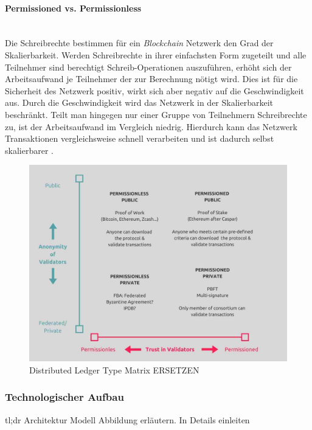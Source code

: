 \paragraph{Permissioned vs. Permissionless}$~~$\\
Die Schreibrechte bestimmen für ein \textit{Blockchain} Netzwerk den Grad der Skalierbarkeit. Werden Schreibrechte in ihrer einfachsten Form zugeteilt und alle Teilnehmer sind berechtigt Schreib-Operationen auszuführen, erhöht sich der Arbeitsaufwand je Teilnehmer der zur Berechnung nötigt wird. Dies ist für die Sicherheit des Netzwerk positiv, wirkt sich aber negativ auf die Geschwindigkeit aus. Durch die Geschwindigkeit wird das Netzwerk in der Skalierbarkeit beschränkt. Teilt man hingegen nur einer Gruppe von Teilnehmern Schreibrechte zu, ist der Arbeitsaufwand im Vergleich niedrig. Hierdurch kann das Netzwerk Transaktionen vergleichsweise schnell verarbeiten und ist dadurch selbst skalierbarer \citep{Drescher2017}.

\begin{figure}[h!]
	\centering
	\includegraphics[width=1.0\linewidth]{pictures/dlt-type-matrix}
	\caption[Distributed Ledger Type Matrix]{Distributed Ledger Type Matrix ERSETZEN}
	\label{fig:dlt-type-matrix}
\end{figure}

\subsubsection{Technologischer Aufbau}
tl;dr Architektur Modell Abbildung erläutern. In Details einleiten

